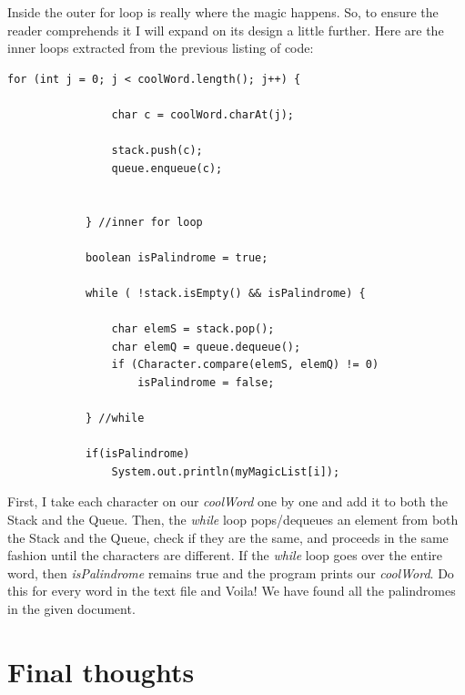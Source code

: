 \documentclass[letterpaper, 10pt]{article}
\begin{document}
Inside the outer for loop is really where the magic happens. So, to ensure the reader comprehends it I will expand on its design a little further. Here are the inner loops extracted from the previous listing of code:
\begin{lstlisting}
for (int j = 0; j < coolWord.length(); j++) {
				
				char c = coolWord.charAt(j);
				
				stack.push(c);
				queue.enqueue(c);
				
				
			} //inner for loop
			
			boolean isPalindrome = true;
			
			while ( !stack.isEmpty() && isPalindrome) {
				
				char elemS = stack.pop();
				char elemQ = queue.dequeue();
				if (Character.compare(elemS, elemQ) != 0)
					isPalindrome = false;
				
			} //while
				
			if(isPalindrome)
				System.out.println(myMagicList[i]);
\end{lstlisting}
First, I take each character on our \textit{coolWord} one by one and add it to both the Stack and the Queue. Then, the \textit{while} loop pops/dequeues an element from both the Stack and the Queue, check if they are the same, and proceeds in the same fashion until the characters are different. If the \textit{while} loop goes over the entire word, then \textit{isPalindrome} remains true and the program prints our \textit{coolWord}. Do this for every word in the text file and Voila! We have found all the palindromes in the given document.

\section{Final thoughts}
\end{document}
